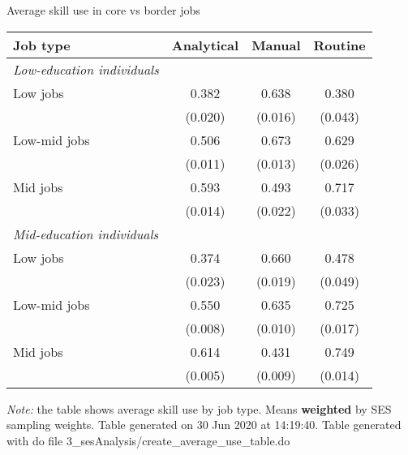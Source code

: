 \begin{center}
\begin{threeparttable}[!h]
\caption{Average skill use in core vs border jobs}
\begin{tabular}{lccc}
\toprule
\toprule
\textbf{Job type}&\multicolumn{1}{c}{\textbf{Analytical}}&\multicolumn{1}{c}{\textbf{Manual}}&\multicolumn{1}{c}{\textbf{Routine}} \\
\midrule
\textit{Low-education individuals} \\  \midrule
\hspace{3mm}Low jobs&       0.382&       0.638&       0.380\\
                    &     (0.020)&     (0.016)&     (0.043)\\
\hspace{3mm}Low-mid jobs&       0.506&       0.673&       0.629\\
                    &     (0.011)&     (0.013)&     (0.026)\\
\hspace{3mm}Mid jobs&       0.593&       0.493&       0.717\\
                    &     (0.014)&     (0.022)&     (0.033)\\
\textit{Mid-education individuals} \\  \midrule
\hspace{3mm}Low jobs&       0.374&       0.660&       0.478\\
                    &     (0.023)&     (0.019)&     (0.049)\\
\hspace{3mm}Low-mid jobs&       0.550&       0.635&       0.725\\
                    &     (0.008)&     (0.010)&     (0.017)\\
\hspace{3mm}Mid jobs&       0.614&       0.431&       0.749\\
                    &     (0.005)&     (0.009)&     (0.014)\\
\bottomrule
\bottomrule
\end{tabular}
\begin{tablenotes}
\item \footnotesize \textit{Note:} the table shows average skill use by job type. Means \textbf{weighted} by SES sampling weights. Table generated on 30 Jun 2020 at 14:19:40. Table generated with do file 3\_sesAnalysis/create\_average\_use\_table.do
\end{tablenotes}
\end{threeparttable}
\end{center}
